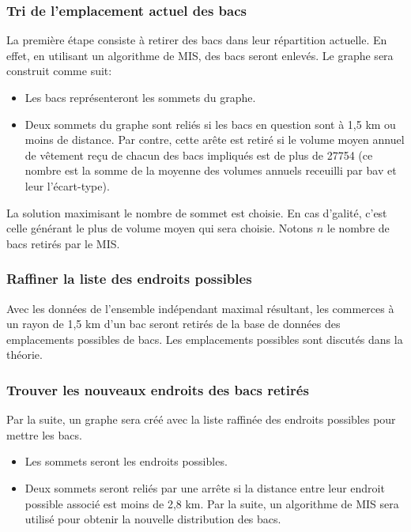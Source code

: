 \documentclass[11pt]{article}
\begin{document}
\subsubsection{Tri de l'emplacement actuel des bacs}
La première étape consiste à retirer des bacs dans leur répartition actuelle. En effet, en utilisant un algorithme de MIS, des bacs seront enlevés. Le graphe sera construit comme suit:
\begin{itemize}
    \item Les bacs représenteront les sommets du graphe.
    \item Deux sommets du graphe sont reliés si les bacs en question sont à 1,5 km ou moins de distance. Par contre, cette arête est retiré si le volume moyen annuel de vêtement reçu de chacun des bacs impliqués est de plus de 27754 (ce nombre est la somme de la moyenne des volumes annuels receuilli par bav et leur l'écart-type). 
\end{itemize}
La solution maximisant le nombre de sommet est choisie. En cas d'galité, c'est celle générant le plus de volume moyen qui sera choisie. Notons $n$ le nombre de bacs retirés par le MIS.

\subsubsection{Raffiner la liste des endroits possibles}
Avec les données de l’ensemble indépendant maximal résultant, les commerces à un rayon de 1,5 km d'un bac seront retirés de la base de données des emplacements possibles de bacs. Les emplacements possibles sont discutés dans la théorie.

\subsubsection{Trouver les nouveaux endroits des bacs retirés}
Par la suite, un graphe sera créé avec la liste raffinée des endroits possibles pour mettre les bacs.
\begin{itemize}
    \item Les sommets seront les endroits possibles.
    \item Deux sommets seront reliés par une arrête si la distance entre leur endroit possible associé est moins de 2,8 km. Par la suite, un algorithme de MIS sera utilisé pour obtenir la nouvelle distribution des bacs.
\end{itemize}
\end{document}
